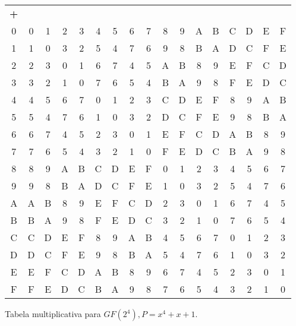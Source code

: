 \documentclass[fleqn]{article}
\begin{document}
\begin{enumerate}[label=\textbf{\arabic*})]
\begin{tabular}{c *{16}{>{\color[gray]{0.35}}c}}
\textbf{+} & \color{black}{0} & \color{black}{1} & \color{black}{2}
& \color{black}{3} & \color{black}{4} & \color{black}{5} & \color{black}{6}
& \color{black}{7} & \color{black}{8} & \color{black}{9} & \color{black}{A}
& \color{black}{B} & \color{black}{C} & \color{black}{D} & \color{black}{E}
& \color{black}{F} \\
0 & 0 & 1 & 2 & 3 & 4 & 5 & 6 & 7 & 8 & 9 & A & B & C & D & E & F \\
1 & 1 & 0 & 3 & 2 & 5 & 4 & 7 & 6 & 9 & 8 & B & A & D & C & F & E \\
2 & 2 & 3 & 0 & 1 & 6 & 7 & 4 & 5 & A & B & 8 & 9 & E & F & C & D \\
3 & 3 & 2 & 1 & 0 & 7 & 6 & 5 & 4 & B & A & 9 & 8 & F & E & D & C \\
4 & 4 & 5 & 6 & 7 & 0 & 1 & 2 & 3 & C & D & E & F & 8 & 9 & A & B \\
5 & 5 & 4 & 7 & 6 & 1 & 0 & 3 & 2 & D & C & F & E & 9 & 8 & B & A \\
6 & 6 & 7 & 4 & 5 & 2 & 3 & 0 & 1 & E & F & C & D & A & B & 8 & 9 \\
7 & 7 & 6 & 5 & 4 & 3 & 2 & 1 & 0 & F & E & D & C & B & A & 9 & 8 \\
8 & 8 & 9 & A & B & C & D & E & F & 0 & 1 & 2 & 3 & 4 & 5 & 6 & 7 \\
9 & 9 & 8 & B & A & D & C & F & E & 1 & 0 & 3 & 2 & 5 & 4 & 7 & 6 \\
A & A & B & 8 & 9 & E & F & C & D & 2 & 3 & 0 & 1 & 6 & 7 & 4 & 5 \\
B & B & A & 9 & 8 & F & E & D & C & 3 & 2 & 1 & 0 & 7 & 6 & 5 & 4 \\
C & C & D & E & F & 8 & 9 & A & B & 4 & 5 & 6 & 7 & 0 & 1 & 2 & 3 \\
D & D & C & F & E & 9 & 8 & B & A & 5 & 4 & 7 & 6 & 1 & 0 & 3 & 2 \\
E & E & F & C & D & A & B & 8 & 9 & 6 & 7 & 4 & 5 & 2 & 3 & 0 & 1 \\
F & F & E & D & C & B & A & 9 & 8 & 7 & 6 & 5 & 4 & 3 & 2 & 1 & 0 \\
\end{tabular}

Tabela multiplicativa para $GF(2^4), P = x^4 + x + 1$.


\end{enumerate}
\end{document}
